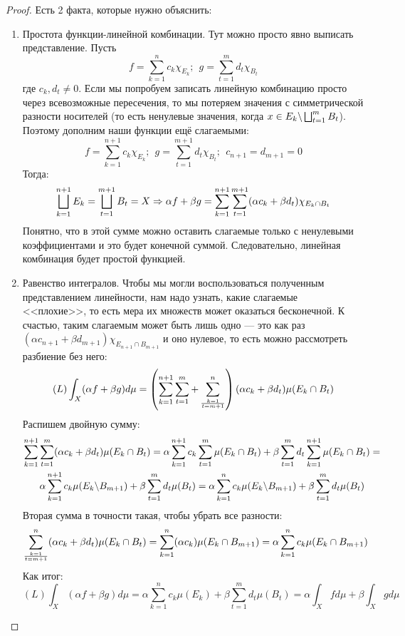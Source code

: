 \begin{proof}
	Есть 2 факта, которые нужно объяснить:
	\begin{enumerate}
		\item Простота функции-линейной комбинации. Тут можно просто явно выписать представление. Пусть
		\[
			f = \sum_{k = 1}^n c_k \chi_{E_k};\ \ g = \sum_{t = 1}^m d_t \chi_{B_t}
		\]
		где $c_k, d_t \neq 0$. Если мы попробуем записать линейную комбинацию просто через всевозможные пересечения, то мы потеряем значения с симметрической разности носителей (то есть ненулевые значения, когда $x \in E_k \backslash \bigsqcup_{t = 1}^m B_t$). Поэтому дополним наши функции ещё слагаемыми:
		\[
			f = \sum_{k = 1}^{n + 1} c_k \chi_{E_k};\ \ g = \sum_{t = 1}^{m + 1} d_t \chi_{B_t};\ \ c_{n + 1} = d_{m + 1} = 0
		\]
		Тогда:
		\[
			\bigsqcup_{k = 1}^{n + 1} E_k = \bigsqcup_{t = 1}^{m + 1} B_t = X \Rightarrow \alpha f + \beta g = \sum_{k = 1}^{n + 1} \sum_{t = 1}^{m + 1} (\alpha c_k + \beta d_t) \chi_{E_k \cap B_t}
		\]
		Понятно, что в этой сумме можно оставить слагаемые только с ненулевыми коэффициентами и это будет конечной суммой. Следовательно, линейная комбинация будет простой функцией.
		
		\item Равенство интегралов. Чтобы мы могли воспользоваться полученным представлением линейности, нам надо узнать, какие слагаемые <<плохие>>, то есть мера их множеств может оказаться бесконечной. К счастью, таким слагаемым может быть лишь одно --- это как раз $(\alpha c_{n + 1} + \beta d_{m + 1})\chi_{E_{n + 1} \cap B_{m + 1}}$ и оно нулевое, то есть можно рассмотреть разбиение без него:
		\[
			(L)\int_X (\alpha f + \beta g) d\mu = \left(\sum_{k = 1}^{n + 1} \sum_{t = 1}^m + \sum_{k = 1 \over {t = m + 1}}^n\right) (\alpha c_k + \beta d_t) \mu(E_k \cap B_t)
		\]
		Распишем двойную сумму:
		\begin{multline*}
			\sum_{k = 1}^{n + 1} \sum_{t = 1}^m (\alpha c_k + \beta d_t)\mu(E_k \cap B_t) = \alpha \sum_{k = 1}^{n + 1} c_k \sum_{t = 1}^m \mu(E_k \cap B_t) + \beta \sum_{t = 1}^m d_t \sum_{k = 1}^{n + 1} \mu(E_k \cap B_t) =
			\\
			\alpha \sum_{k = 1}^{n + 1} c_k \mu(E_k \backslash B_{m + 1}) + \beta \sum_{t = 1}^m d_t \mu(B_t) = \alpha \sum_{k = 1}^n c_k \mu(E_k \backslash B_{m + 1}) + \beta \sum_{t = 1}^m d_t \mu(B_t)
		\end{multline*}
		Вторая сумма в точности такая, чтобы убрать все разности:
		\[
			\sum_{k = 1 \over {t = m + 1}}^n (\alpha c_k + \beta d_t)\mu(E_k \cap B_t) = \sum_{k = 1}^n (\alpha c_k)\mu(E_k \cap B_{m + 1}) = \alpha \sum_{k = 1}^n c_k \mu(E_k \cap B_{m + 1})
		\]
		Как итог:
		\[
			(L)\int_X (\alpha f + \beta g)d\mu = \alpha\sum_{k = 1}^n c_k\mu(E_k) + \beta\sum_{t = 1}^m d_t\mu(B_t) = \alpha\int_X fd\mu + \beta\int_X gd\mu
		\]
	\end{enumerate}
\end{proof}

